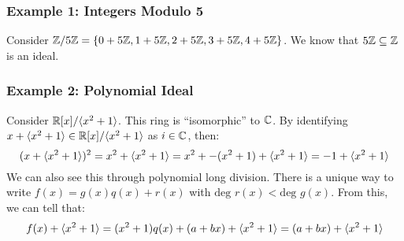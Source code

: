 \documentclass[letterpaper]{article}
\begin{document}
\subsubsection{Example 1: Integers Modulo 5}
Consider $\mathbb{Z} / 5\mathbb{Z} = \{0 + 5\mathbb{Z}, 1 + 5\mathbb{Z}, 2 + 5\mathbb{Z}, 3 + 5\mathbb{Z}, 4 + 5\mathbb{Z}\}$. We know that $5\mathbb{Z} \subseteq \mathbb{Z}$ is an ideal. 

\subsubsection{Example 2: Polynomial Ideal}
Consider $\mathbb{R}[x] / \langle x^2 + 1 \rangle$. This ring is ``isomorphic'' to $\mathbb{C}$. By identifying $x + \langle x^2 + 1 \rangle \in \mathbb{R}[x] / \langle x^2 + 1 \rangle$ as $i \in \mathbb{C}$, then:
\[(x + \langle x^2 + 1 \rangle)^2 = x^2 + \langle x^2 + 1 \rangle = x^2 + -(x^2 + 1) + \langle x^2 + 1 \rangle = -1 + \langle x^2 + 1 \rangle\]
We can also see this through polynomial long division. There is a unique way to write $f(x) = g(x)q(x) + r(x)$ with $\text{deg } r(x) < \text{deg } g(x)$. From this, we can tell that: 
\[f(x) + \langle x^2 + 1 \rangle = (x^2 + 1)q(x) + (a + bx) + \langle x^2 + 1 \rangle = (a + bx) + \langle x^2 + 1 \rangle\]
\end{document}
